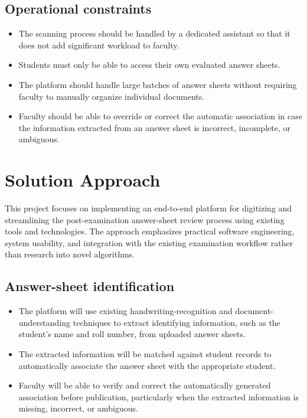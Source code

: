 \documentclass[11pt,a4paper]{article}
\begin{document}
\subsection{Operational constraints}
\begin{itemize}[leftmargin=0.7cm]
    \item The scanning process should be handled by a dedicated assistant so that it does not add significant workload to faculty.
    \item Students must only be able to access their own evaluated answer sheets.
    \item The platform should handle large batches of answer sheets without requiring faculty to manually organize individual documents.
    \item Faculty should be able to override or correct the automatic association in case the information extracted from an answer sheet is incorrect, incomplete, or ambiguous.
\end{itemize}

\section{Solution Approach}
This project focuses on implementing an end-to-end platform for digitizing and streamlining the post-examination answer-sheet review process using existing tools and technologies. The approach emphasizes practical software engineering, system usability, and integration with the existing examination workflow rather than research into novel algorithms.

\subsection{Answer-sheet identification}
\begin{itemize}[leftmargin=0.7cm]
    \item The platform will use existing handwriting-recognition and document-understanding techniques to extract identifying information, such as the student's name and roll number, from uploaded answer sheets.
    \item The extracted information will be matched against student records to automatically associate the answer sheet with the appropriate student.
    \item Faculty will be able to verify and correct the automatically generated association before publication, particularly when the extracted information is missing, incorrect, or ambiguous.
\end{itemize}
\end{document}
